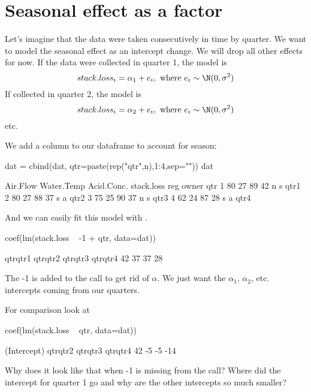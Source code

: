 \section{Seasonal effect as a factor}

Let's imagine that the data were taken consecutively in time by quarter.  We want to model the seasonal effect as an intercept change.  We will drop all other effects for now.
If the data were collected in quarter 1, the model is
\begin{equation}\label{eqn:season.i}
stack.loss_i = \alpha_1 + e_i, \text{ where } e_i \sim \N(0,\sigma^2) 
\end{equation}
If collected in quarter 2, the model is
\begin{equation}
stack.loss_i = \alpha_2 + e_i, \text{ where } e_i \sim \N(0,\sigma^2) 
\end{equation}
etc.

We add a column to our dataframe to account for season:
\begin{Schunk}
\begin{Sinput}
 dat = cbind(dat, qtr=paste(rep("qtr",n),1:4,sep=""))
 dat
\end{Sinput}
\begin{Soutput}
  Air.Flow Water.Temp Acid.Conc. stack.loss reg owner  qtr
1       80         27         89         42   n     s qtr1
2       80         27         88         37   s     a qtr2
3       75         25         90         37   n     s qtr3
4       62         24         87         28   s     a qtr4
\end{Soutput}
\end{Schunk}
And we can easily fit this model with \verb@lm@.
\begin{Schunk}
\begin{Sinput}
 coef(lm(stack.loss ~ -1 + qtr, data=dat))
\end{Sinput}
\begin{Soutput}
qtrqtr1 qtrqtr2 qtrqtr3 qtrqtr4 
     42      37      37      28 
\end{Soutput}
\end{Schunk}
The -1 is added to the \verb@lm@ call to get rid of $\alpha$.  We just want the $\alpha_1$, $\alpha_2$, etc. intercepts coming from our quarters.  

For comparison look at 
\begin{Schunk}
\begin{Sinput}
 coef(lm(stack.loss ~ qtr, data=dat))
\end{Sinput}
\begin{Soutput}
(Intercept)     qtrqtr2     qtrqtr3     qtrqtr4 
         42          -5          -5         -14 
\end{Soutput}
\end{Schunk}
Why does it look like that when -1 is missing from the \verb@lm@ call?  Where did the intercept for quarter 1 go and why are the other intercepts so much smaller?

